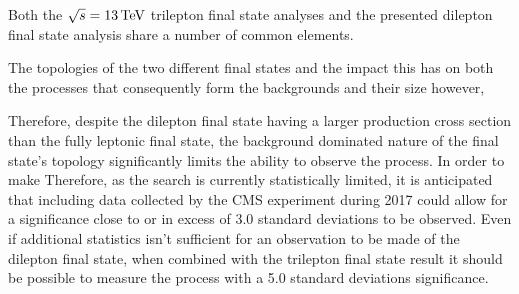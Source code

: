 Both the $\sqrt{s} = 13 \,\text{Te\hspace{-.08em}V}$ trilepton final state analyses and the presented dilepton final state analysis share a number of common elements.

The topologies of the two different final states and the impact this has on both the processes that consequently form the backgrounds and their size however, 

Therefore, despite the dilepton final state having a larger production cross section than the fully leptonic final state, the background dominated nature of the final state's topology significantly limits the ability to observe the process.
In order to make 
Therefore, as the search is currently statistically limited, it is anticipated that including data collected by the CMS experiment during 2017 could allow for a significance close to or in excess of 3.0 standard deviations to be observed.
Even if additional statistics isn't sufficient for an observation to be made of the dilepton final state, when combined with the trilepton final state result it should be possible to measure the process with a 5.0 standard deviations significance.
